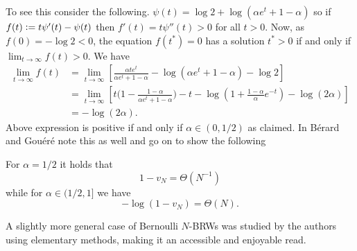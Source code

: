 To see this consider the following. $\psi(t) = \log 2 + \log (\alpha e^t + 1 - \alpha)$ so if $f(t) \vcentcolon= t \psi'(t) - \psi(t)$ then $f'(t) = t \psi''(t) > 0$ for all $t > 0$. Now, as $f(0) = -\log 2 < 0$, the equation $f(t^*) = 0$ has a solution $t^* > 0$ if and only if $\lim_{t \to \infty} f(t) > 0$. We have
\begin{align*}
\lim\limits_{t \to \infty} f(t) &= \lim\limits_{t \to \infty} \left[\frac{\alpha t e^t}{\alpha e^t + 1 - \alpha} - \log(\alpha e^t + 1 - \alpha) - \log 2 \right] \\
								&= \lim\limits_{t \to \infty} \left[ t \big( 1 - \frac{1 - \alpha}{\alpha e^t + 1 - \alpha}\big) - t - \log (1 + \frac{1-\alpha}{\alpha} e^{-t}) - \log(2 \alpha) \right] \\
								&= - \log(2\alpha). 
\end{align*} 
Above expression is positive if and only if $\alpha \in (0, 1/2)$ as claimed. In \cite{exp_tails} Bérard and Gouéré note this as well and go on to show the following
\begin{theorem}
For $\alpha = 1/2$ it holds that
\begin{equation}\nonumber
1 - v_N = \Theta(N^{-1})
\end{equation}
while for $\alpha \in (1/2, 1]$ we have
\begin{equation}\nonumber
- \log (1 - v_N) = \Theta(N). 
\end{equation}
\end{theorem}
\begin{remark}A slightly more general case of Bernoulli $N$-BRWs was studied by the authors \cite{couronne2014branching} using elementary methods, making it an accessible and enjoyable read. 
\end{remark}





